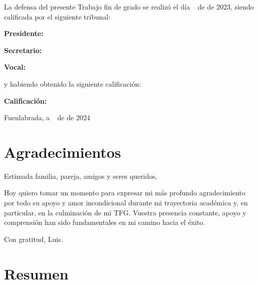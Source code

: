 \documentclass[a4paper, 12pt]{book}
\begin{document}
	\vspace{1cm}
	La defensa del presente Trabajo fin de grado se realizó el día \qquad$\;\,$ de \qquad\qquad\qquad\qquad \newline de 2023, siendo calificada por el siguiente tribunal:
	
	
	\vspace{0.5cm}
	\textbf{Presidente:}
	
	\vspace{1.2cm}
	\textbf{Secretario:}
	
	\vspace{1.2cm}
	\textbf{Vocal:}
	
	
	\vspace{1.2cm}
	y habiendo obtenido la siguiente calificación:
	
	\vspace{1cm}
	\textbf{Calificación:}
	
	
	\vspace{1cm}
	\begin{flushright}
		Fuenlabrada, a \qquad$\;\,$ de \qquad\qquad\qquad\qquad de 2024
	\end{flushright}
	
	
	
	\chapter*{Agradecimientos}
	
	Estimada familia, pareja, amigos y seres queridos,
	
	Hoy quiero tomar un momento para expresar mi más profundo agradecimiento por todo su apoyo y amor incondicional durante mi trayectoria académica y, en particular, en la culminación de mi TFG. Vuestra presencia constante, apoyo y comprensión han sido fundamentales en mi camino hacia el éxito.
	
	
	Con gratitud,
	Luis.
	
	
	\chapter*{Resumen}
	
\end{document}
